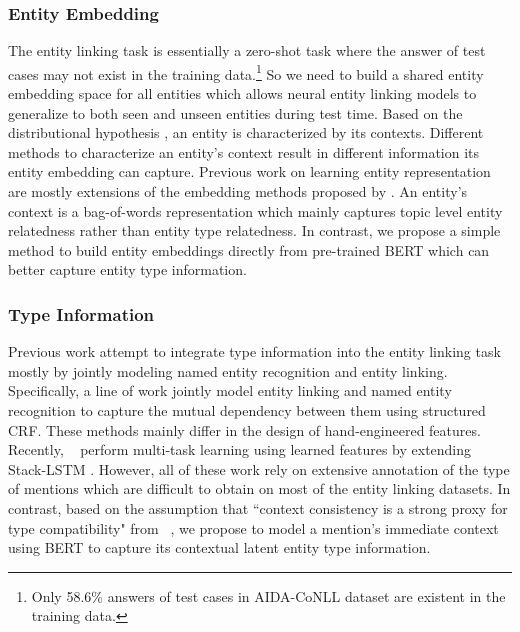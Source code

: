\documentclass[letterpaper]{article} \usepackage{aaai20}  \usepackage{times}  \usepackage{helvet} \usepackage{courier}  \usepackage[hyphens]{url}  \usepackage{graphicx} \urlstyle{rm} \def\UrlFont{\rm}  \usepackage{graphicx}  \frenchspacing  \setlength{\pdfpagewidth}{8.5in}  \setlength{\pdfpageheight}{11in}  \usepackage{multirow}
\newcommand{\namecite}[1]{\citeauthor{#1}~\shortcite{#1}}
\begin{document}
    \subsubsection{Entity Embedding}
    The entity linking task is essentially a zero-shot task where the answer of test cases may not exist in the training data.\footnote{Only 58.6\% answers of test cases in AIDA-CoNLL dataset are existent in the training data.} So we need to build a shared entity embedding space for all entities which allows neural entity linking models to generalize to both seen and unseen entities during test time. 
    Based on the distributional hypothesis \cite{harris1954distributional}, an entity is characterized by its contexts. Different methods to characterize an entity's context result in different information its entity embedding can capture. Previous work \cite{yamada2016joint,ganea2017deep} on learning entity representation are mostly extensions of the embedding methods proposed by \cite{mikolov2013distributed}. An entity's context is a bag-of-words representation which mainly captures topic level entity relatedness rather than entity type relatedness. 
    In contrast, we propose a simple method to build entity embeddings directly from pre-trained BERT \cite{devlin-etal-2019-bert} which can better capture entity type information. 

    \subsubsection{Type Information}
    Previous work attempt to integrate type information into the entity linking task mostly by jointly modeling named entity recognition and entity linking. Specifically, a line of work \cite{durrett-klein-2014-joint,luo2015joint,nguyen2016j} jointly model entity linking and named entity recognition to capture the mutual dependency between them using structured CRF. These methods mainly differ in the design of hand-engineered features. Recently, \namecite{martins-etal-2019-joint} perform multi-task learning using learned features by extending Stack-LSTM \cite{dyer-etal-2015-transition}. However, all of these work rely on extensive annotation of the type of mentions which are difficult to obtain on most of the entity linking datasets. In contrast, based on the assumption that ``context consistency is a strong proxy for type compatibility" from \namecite{zhou-etal-2018-zero}, we propose to model a mention's immediate context using BERT \cite{devlin-etal-2019-bert} to capture its contextual latent entity type information.
\end{document}
